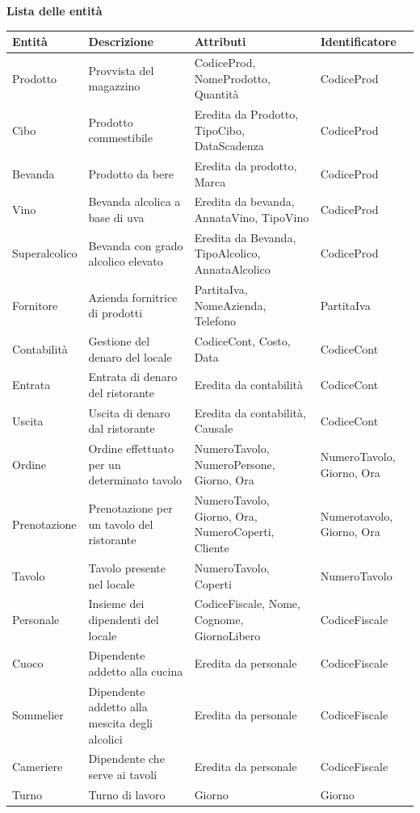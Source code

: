 \textbf{Lista delle entità}
\begin{longtable}{p{2.5cm} p{4cm} p{5cm} p{2.5cm}}
    \toprule
    \textbf{Entità} & \textbf{Descrizione} &   \textbf{Attributi} & \textbf{Identificatore}\\ \midrule
    Prodotto & Provvista del magazzino & CodiceProd, NomeProdotto, Quantità & CodiceProd\\ \midrule
    Cibo & Prodotto commestibile & Eredita da Prodotto, TipoCibo, DataScadenza & CodiceProd \\ \midrule
    Bevanda	& Prodotto da bere & Eredita da prodotto, Marca & CodiceProd\\ \midrule
    Vino & Bevanda alcolica a base di uva & Eredita da bevanda, AnnataVino, TipoVino & CodiceProd \\ \midrule
    Superalcolico & Bevanda con grado alcolico elevato & Eredita da Bevanda, TipoAlcolico, AnnataAlcolico & CodiceProd \\ \midrule
    Fornitore & Azienda fornitrice di prodotti & PartitaIva, NomeAzienda, Telefono & PartitaIva \\ \midrule
    Contabilità & Gestione del denaro del locale & CodiceCont, Costo, Data &CodiceCont \\ \midrule
    Entrata & Entrata di denaro del ristorante & Eredita da contabilità & CodiceCont \\ \midrule
    Uscita & Uscita di denaro dal ristorante & Eredita da contabilità, Causale & CodiceCont \\ \midrule
    Ordine & Ordine effettuato per un determinato tavolo & NumeroTavolo, NumeroPersone, Giorno, Ora & NumeroTavolo, Giorno, Ora\\ \midrule
    Prenotazione & Prenotazione per un tavolo del ristorante & NumeroTavolo, Giorno, Ora, NumeroCoperti, Cliente & Numerotavolo, Giorno, Ora \\ \midrule
    Tavolo & Tavolo presente nel locale & NumeroTavolo, Coperti & NumeroTavolo\\ \midrule
    Personale & Insieme dei dipendenti del locale & CodiceFiscale, Nome, Cognome, GiornoLibero & CodiceFiscale\\ \midrule
    Cuoco & Dipendente addetto alla cucina & Eredita da personale & CodiceFiscale\\ \midrule
    Sommelier & Dipendente addetto alla mescita degli alcolici & Eredita da personale & CodiceFiscale\\ \midrule
    Cameriere & Dipendente che serve ai tavoli & Eredita da personale & CodiceFiscale\\ \midrule
    Turno & Turno di lavoro & Giorno & Giorno\\ 
    \bottomrule	
\end{longtable}

